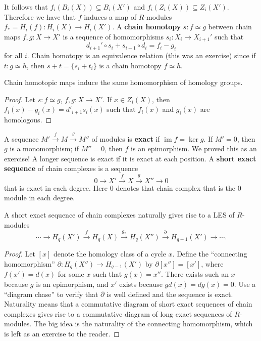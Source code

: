 It follows that $f_i (B_i (X))\subseteq B_i (X')$ and $f_i (Z_i (X))\subseteq Z_i (X')$. Therefore we have that $f$ induces a map of $R$-modules $f_*=H_i (f) \colon H_i (X)\to H_i (X') $. A \textbf{chain homotopy} $s \colon f \simeq g $ between chain maps $f,g \colon X \to X'$ is a sequence of homomorphisms $s_i \colon X_i  \to X_{i+1}'$ such that \[
d_{i+1}'\circ s_i +s_{i-1}\circ d_i =f_i -g_i 
\] for all $i$. Chain homotopy is an equivalence relation (this was an exercise) since if $t \colon g \simeq h$, then $s+t=\{s_i +t_i \} $ is a chain homotopy $f \simeq h$.
\begin{lemma}
    Chain homotopic maps induce the same homomorphism of homology groups.
\end{lemma}
\begin{proof}
    Let $s \colon f \simeq g$, $f,g \colon X \to X'$. If $x\in Z_i (X)$, then $
        f_i (x)-g_i (x)=d'_{i+1}s_i (x)
$ such that $f_i (x)$ and $g_i (x)$ are homologous.
\end{proof}
\orbreak
A sequence $M' \overset{f}{\to } M \overset{g}{\to } M''$ of modules is \textbf{exact} if $\operatorname{im}f=\ker g$. If $M'=0$, then $g$ is a monomorphism; if $M''=0$, then $f$ is an epimorphism. We proved this as an exercise! A longer sequence is exact if it is exact at each position. A \textbf{short exact sequence} of chain complexes is a sequence \[
0\to X' \overset{f}{\to } X \overset{g}{\to } X''\to 0
\] that is exact in each degree. Here $0$ denotes that chain complex that is the $0$ module in each degree.
\begin{prop}
    A short exact sequence of chain complexes naturally gives rise to a LES of $R$-modules \[
        \cdots \to H_q(X')\overset{f}{\to} H_q(X)\overset{g_*}{\to } H_q(X'')\overset{\partial }{\to } H_{q-1}(X')\to \cdots .
    \] 
\end{prop}
\begin{proof}
    Let $[x]$ denote the homology class of a cycle $x$. Define the ``connecting homomorphism'' $\partial \colon H_q(X'') \to H_{q-1}(X')$ by $\partial [x'']=[x']$, where $f(x')=d(x)$ for some $x$ such that $g(x)=x''$. There exists such an $x$ because $g$ is an epimorphism, and $x'$ exists because $gd(x)=dg(x)=0$. Use a ``diagram chase'' to verify that $\partial $ is well defined and the sequence is exact. Naturality means that a commutative diagram of short exact sequences of chain complexes gives rise to a commutative diagram of long exact sequences of $R$-modules. The big idea is the naturality of the connecting homomorphism, which is left as an exercise to the reader.
\end{proof}

